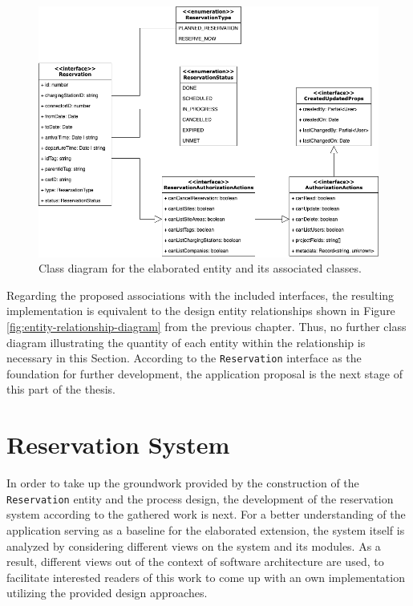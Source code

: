 \begin{figure}[h]
    \centering
    \includegraphics[scale=0.4]{resources/images/main/6_implementation/Reservation.png}
    \caption{Class diagram for the elaborated entity and its associated classes.}
    \label{fig:reservation-class-diagram}
\end{figure}

\noindent Regarding the proposed associations with the included interfaces, the resulting implementation is equivalent to the design entity relationships shown in Figure \ref{fig:entity-relationship-diagram} from the previous chapter. Thus, no further class diagram illustrating the quantity of each entity within the relationship is necessary in this Section.
According to the \texttt{Reservation} interface as the foundation for further development, the application proposal is the next stage of this part of the thesis. 

\section{Reservation System}
\label{ch:Implementation:sec:Reservation System}

In order to take up the groundwork provided by the construction of the \texttt{Reservation} entity and the process design, the development of the reservation system according to the gathered work is next.
For a better understanding of the application serving as a baseline for the elaborated extension, the system itself is analyzed by considering different views on the system and its modules.
As a result, different views out of the context of software architecture are used, to facilitate interested readers of this work to come up with an own implementation utilizing the provided design approaches.

